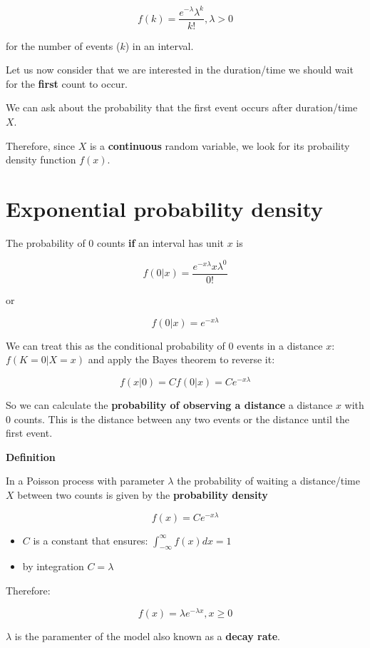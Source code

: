 \documentclass[
]{book}
\begin{document}
\[f(k)=\frac{e^{-\lambda}\lambda^k}{k!}, \lambda>0\]

for the number of events (\(k\)) in an interval.

Let us now consider that we are interested in the duration/time we should wait for the \textbf{first} count to occur.

We can ask about the probability that the first event occurs after duration/time \(X\).

Therefore, since \(X\) is a \textbf{continuous} random variable, we look for its probaility density function \(f(x)\).

\hypertarget{exponential-probability-density}{%
\section{Exponential probability density}\label{exponential-probability-density}}

The probability of \(0\) counts \textbf{if} an interval has unit \(x\) is

\[f(0|x)=\frac{e^{-x\lambda}x\lambda^0}{0!}\]

or

\[f(0|x)=e^{-x\lambda}\]

We can treat this as the conditional probability of \(0\) events in a distance \(x\): \(f(K=0|X=x)\) and apply the Bayes theorem to reverse it:

\[f(x|0)=C f(0|x)=C e^{-x\lambda}\]

So we can calculate the \textbf{probability of observing a distance} a distance \(x\) with \(0\) counts. This is the distance between any two events or the distance until the first event.

\textbf{Definition}

In a Poisson process with parameter \(\lambda\) the probability of waiting a distance/time \(X\) between two counts is given by the \textbf{probability density}

\[f(x)= C e^{-x\lambda}\]

\begin{itemize}
\item
  \(C\) is a constant that ensures: \(\int_{-\infty}^{\infty} f(x) dx =1\)
\item
  by integration \(C=\lambda\)
\end{itemize}

Therefore:

\[f(x)=\lambda e^{-\lambda x}, x\geq 0\]

\(\lambda\) is the paramenter of the model also known as a \textbf{decay rate}.
\end{document}
